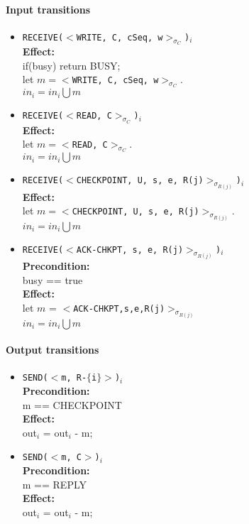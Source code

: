 \documentclass[letterpaper,twocolumn,10pt]{article}
\begin{document}
\paragraph{Input transitions}

\begin{itemize}
\item{\texttt{RECEIVE($<$WRITE, C, cSeq, w$>_{\sigma_{C}}$)$_{i}$}}\\ 
\textbf{Effect:}\\
if(busy) return BUSY;\\
let $m = <$\texttt{WRITE, C, cSeq, w}$>_{\sigma_{C}}$.\\
$in_{i} = in_{i} \bigcup m$\\

\item{\texttt{RECEIVE($<$READ, C$>_{\sigma_{C}}$)$_{i}$}} \\
\textbf{Effect:}\\
let $m = <$\texttt{READ, C}$>_{\sigma_{C}}$.\\
$in_{i} = in_{i} \bigcup m$\\

\item{\texttt{RECEIVE($<$CHECKPOINT, U, s, e, R(j)$>_{\sigma_{R(j)}}$)$_{i}$}}\\
\textbf{Effect:}\\
let $m = <$\texttt{CHECKPOINT, U, s, e, R(j)}$>_{\sigma_{R(j)}}$.\\
$in_{i} = in_{i} \bigcup m$\\

\item{\texttt{RECEIVE($<$ACK-CHKPT, s, e, R(j)$>_{\sigma_{R(j)}}$)$_{i}$}}\\
\textbf{Precondition:}\\
busy == true\\
\textbf{Effect:}\\
let $m$ = $<$\texttt{ACK-CHKPT,s,e,R(j)}$>_{\sigma_{R(j)}}$\\
$in_{i} = in_{i} \bigcup m$\\
\end{itemize}


\paragraph{Output transitions}

\begin{itemize}

\item{\texttt{SEND($<$m, R-$\{$i$\}>$)$_{i}$}}\\
\textbf{Precondition:}\\
m == CHECKPOINT\\
\textbf{Effect:}\\
out$_{i}$ = out$_{i}$ - m;

\item{\texttt{SEND($<$m, C$>$)$_{i}$}}\\
\textbf{Precondition:}\\
m == REPLY\\
\textbf{Effect:}\\
out$_{i}$ = out$_{i}$ - m;

\end{itemize}
\end{document}
